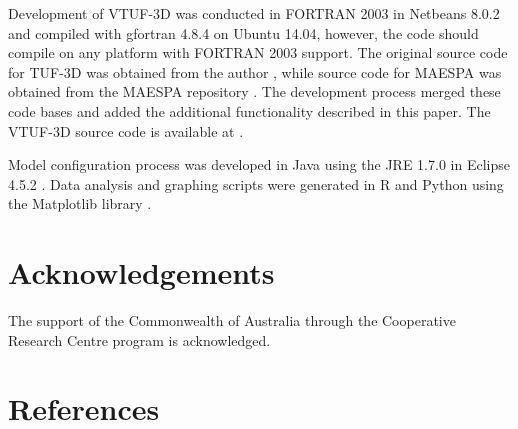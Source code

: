 \documentclass[final,3p,times,authoryear]{elsarticle}
\begin{document}
Development of VTUF-3D was conducted in FORTRAN 2003 \citep{GNU2016a} in Netbeans 8.0.2 \citep{Netbeans2016} and compiled with gfortran 4.8.4 \citep{GNU2016} on Ubuntu 14.04, however, the code should compile on any platform with FORTRAN 2003 support. The original source code for TUF-3D was obtained from the author \citep{Krayenhoff2007}, while source code for MAESPA was obtained from the MAESPA repository \citep{Duursma2016}. The development process merged these code bases and added the additional functionality described in this paper. The VTUF-3D source code is available at \cite{Nice2016c}.

Model configuration process was developed in Java using the JRE 1.7.0 \citep{Oracle2016} in Eclipse 4.5.2 \citep{Eclipse2016}. Data analysis and graphing scripts were generated in R \citep{R2013} and Python \citep{Python2016} using the Matplotlib library \citep{Hunter2007}. 

\section*{Acknowledgements}
The support of the Commonwealth of Australia through the Cooperative Research Centre program is acknowledged.

\section*{References}\label{sec:ref}
   
  


\begin{thebibliography}{00}


\bibitem[ ()]{}

\end{thebibliography}


\appendix
\setcounter{table}{0}
\renewcommand{\thetable}{A\arabic{table}}

\end{document}
